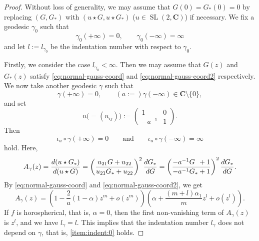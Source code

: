 \documentclass[a4paper]{amsart}
\theoremstyle{plain}
\theoremstyle{remark}
\numberwithin{equation}{section}
\begin{document}
\begin{proof}
 Without loss of generality, we may assume that $G(0)=G_*(0)=0$
 by replacing $(G,G_*)$ with $(u\star G,u\star G_*)$ ($u\in {\operatorname{SL}}(2,{\boldsymbol{C}})$)
 if necessary.
 We fix a geodesic $\gamma_0$ such that
 \[
   \gamma_0(+\infty)=0,\qquad \gamma_0(-\infty)=\infty
 \]
 and let $l:=l_{\gamma_0}$ be the indentation number with respect to
 $\gamma_0$.

 Firstly, we consider the case $l_{\gamma_0}<\infty$.
 Then we may assume that $G(z)$ and $G_*(z)$
 satisfy \eqref{eq:normal-gauss-coord} and
 \eqref{eq:normal-gauss-coord2} respectively.
 We now take another geodesic $\gamma$
 such that
 \begin{equation}\label{eq:sigma}
  \gamma(+\infty)=0,\qquad 
   (a:=)\gamma(-\infty)\in {\boldsymbol{C}}\setminus \{0\},
 \end{equation}
 and set
 \begin{equation}\label{eq:u}
  u\bigl(=(u_{ij})\bigr):=
        \begin{pmatrix}
	   1 & 0 \\
	  -a^{-1} & 1
	\end{pmatrix}.
 \end{equation}
 Then 
 \[
    \iota_u\circ\gamma(+\infty)=0\qquad\text{and}\qquad
    \iota_u\circ\gamma(-\infty)=\infty
 \]
 hold.
 Here, 
 \begin{equation}\label{eq:transf}
   A_\gamma(z)=\frac{d(u\star G_*)}{d(u\star G)}=
    \left (
          \frac{u_{21}G+u_{22}}{	        u_{21}G_*+u_{22}}\right)^2 
            \frac{dG_*}{dG}
        =
        \left (
	   \frac{-a^{-1}G\hphantom{_*}+1}{-a^{-1}G_*+1}
               \right)^2 \frac{dG_*}{dG}.
 \end{equation}
 By \eqref{eq:normal-gauss-coord} and
 \eqref{eq:normal-gauss-coord2}, we get
 \[
   A_{\gamma}(z)=
   \left (
        1-\frac{2}{a}(1-\alpha)z^m+o(z^m)
   \right)
   \left (
        \alpha+\frac{(m+l)\alpha_1}{m} z^l+o(z^l)
   \right).
 \]
 If $f$ is horospherical, that is, $\alpha=0$, 
 then the first non-vanishing term of  $A_\gamma(z)$ is $z^l$, 
 and we have $l_\gamma=l$.
 This implies that the indentation number 
 $l_\gamma$ does not depend on $\gamma$, 
 that is, \ref{item:indent:0} holds.


\end{proof}
\end{document}

